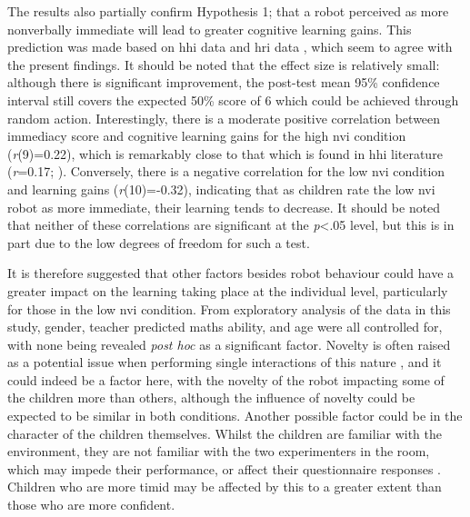 The results also partially confirm Hypothesis 1; that a robot perceived as more nonverbally immediate will lead to greater cognitive \gls{learning} gains. This prediction was made based on \acrshort{hhi} data \citep{witt2004meta} and \acrshort{hri} data \citep{szafir2012pay}, which seem to agree with the present findings. It should be noted that the effect size is relatively small: although there is significant improvement, the post-test mean 95\% confidence interval still covers the expected 50\% score of 6 which could be achieved through random action.  Interestingly, there is a moderate positive correlation between immediacy score and cognitive \gls{learning} gains for the high \acrshort{nvi} condition (\textit{r}(9)=0.22), which is remarkably close to that which is found in \acrshort{hhi} literature (\textit{r}=0.17; \citealp{witt2004meta}). Conversely, there is a negative correlation for the low \acrshort{nvi} condition and \gls{learning} gains (\mbox{\textit{r}(10)=-0.32}), indicating that as children rate the low \acrshort{nvi} robot as more immediate, their \gls{learning} tends to decrease. It should be noted that neither of these correlations are significant at the \textit{p}\textless .05 level, but this is in part due to the low degrees of freedom for such a test.

It is therefore suggested that other factors besides robot behaviour could have a greater impact on the \gls{learning} taking place at the individual level, particularly for those in the low \acrshort{nvi} condition. From exploratory analysis of the data in this study, gender, teacher predicted maths ability, and age were all controlled for, with none being revealed \textit{post hoc} as a significant factor. Novelty is often raised as a potential issue when performing single interactions of this nature \citep{gockley2005designing,kanda2004interactive}, and it could indeed be a factor here, with the novelty of the robot impacting some of the children more than others, although the influence of novelty could be expected to be similar in both conditions. Another possible factor could be in the character of the children themselves. Whilst the children are familiar with the environment, they are not familiar with the two experimenters in the room, which may impede their performance, or affect their questionnaire responses \citep{leite2012modelling}. Children who are more timid may be affected by this to a greater extent than those who are more confident.

